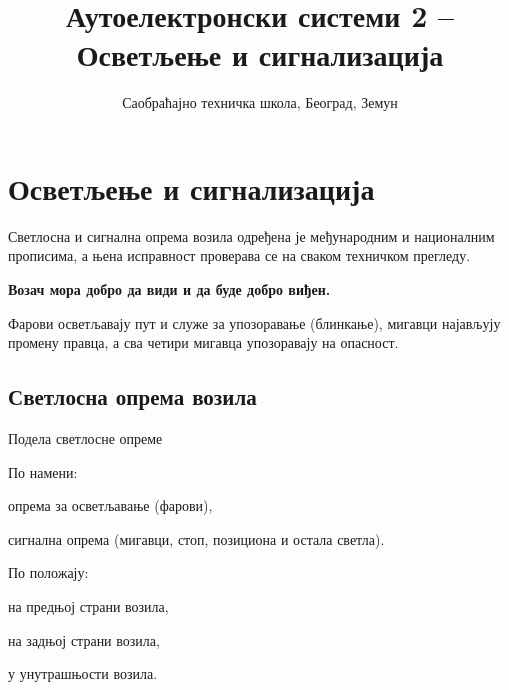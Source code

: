 \documentclass{report}
\title{Аутоелектронски системи 2 -- Осветљење и сигнализација}
\author{Саобраћајно техничка школа, Београд, Земун}
\date{}
\begin{document}
\maketitle
\tableofcontents
\newpage

\chapter{Осветљење и сигнализација}

Светлосна и сигнална опрема возила одређена је међународним и националним
прописима, а њена исправност проверава се на сваком техничком прегледу.

\begin{kljucno}
\centering\textbf{Возач мора добро да види и да буде добро виђен.}
\end{kljucno}

Фарови осветљавају пут и служе за упозоравање (блинкање), мигавци најављују
промену правца, а сва четири мигавца упозоравају на опасност.

\section{Светлосна опрема возила}

\begin{podela}{Подела светлосне опреме}
\begin{lista}
    \item По намени:
    \begin{lista}
        \item опрема за осветљавање (фарови),
        \item сигнална опрема (мигавци, стоп, позициона и остала светла).
    \end{lista}
    \item По положају:
    \begin{lista}
        \item на предњој страни возила,
        \item на задњој страни возила,
        \item у унутрашњости возила.
    \end{lista}
\end{lista}
\end{podela}
\end{document}
